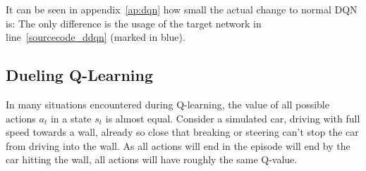 It can be seen in appendix~\ref{ap:dqn} how small the actual change to normal DQN is: The only difference is the usage of the target network in line~\ref{sourcecode_ddqn} (marked in blue).

\subsection{Dueling Q-Learning}

In many situations encountered during Q-learning, the value of all possible actions $a_t$ in a state $s_t$ is almost equal. Consider a simulated car, driving with full speed towards a wall, already so close that breaking or steering can't stop the car from driving into the wall. As all actions will end in the episode will end by the car hitting the wall, all actions will have roughly the same Q-value. 

